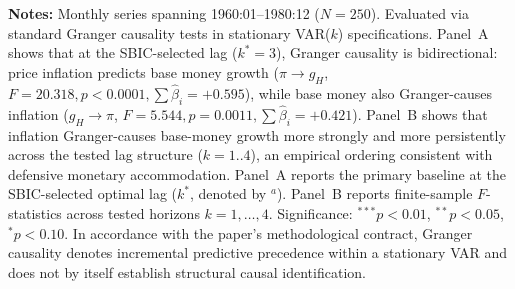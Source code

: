 \begin{table}[htbp]
\centering
\small
\renewcommand{\arraystretch}{0.90}
\caption{Granger Directional Precedence: Master Nominal Core System (Chile, 1960--1980, $N=250$)}
\label{tab:granger_nominal_core}
\begin{minipage}{0.96\textwidth}
\vspace{0.3em}
\footnotesize \textbf{Notes:} Monthly series spanning 1960:01--1980:12 ($N=250$). Evaluated via standard Granger causality tests in stationary VAR($k$) specifications. Panel~A shows that at the SBIC-selected lag ($k^*=3$), Granger causality is bidirectional: price inflation predicts base money growth ($\pi \to g_H$, $F = 20.318, p < 0.0001, \sum \hat{\beta}_i = +0.595$), while base money also Granger-causes inflation ($g_H \to \pi$, $F = 5.544, p = 0.0011, \sum \hat{\beta}_i = +0.421$). Panel~B shows that inflation Granger-causes base-money growth more strongly and more persistently across the tested lag structure ($k=1..4$), an empirical ordering consistent with defensive monetary accommodation. Panel~A reports the primary baseline at the SBIC-selected optimal lag ($k^*$, denoted by $^a$). Panel~B reports finite-sample $F$-statistics across tested horizons $k = 1, \dots, 4$. Significance: $^{***} p < 0.01$, $^{**} p < 0.05$, $^{*} p < 0.10$. In accordance with the paper's methodological contract, Granger causality denotes incremental predictive precedence within a stationary VAR and does not by itself establish structural causal identification.
\end{minipage}
\end{table}
